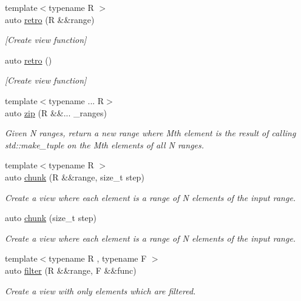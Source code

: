 \begin{DoxyCompactItemize}
{\footnotesize template$<$typename R $>$ }\\auto \mbox{\hyperlink{namespacerah_1_1view_a9f47b2859b0a8a7e136f09d5c33b89e6}{retro}} (R \&\&range)
\begin{DoxyCompactList}\small\item\em \mbox{[}Create view function\mbox{]} \end{DoxyCompactList}\item 
auto \mbox{\hyperlink{namespacerah_1_1view_a8cafe11e62b8f98833a9172cc803f116}{retro}} ()
\begin{DoxyCompactList}\small\item\em \mbox{[}Create view function\mbox{]} \end{DoxyCompactList}\item 
{\footnotesize template$<$typename ... R$>$ }\\auto \mbox{\hyperlink{namespacerah_1_1view_a5b9cacbf101962d95221b591d7f11026}{zip}} (R \&\&... \+\_\+ranges)
\begin{DoxyCompactList}\small\item\em Given N ranges, return a new range where Mth element is the result of calling std\+::make\+\_\+tuple on the Mth elements of all N ranges. \end{DoxyCompactList}\item 
{\footnotesize template$<$typename R $>$ }\\auto \mbox{\hyperlink{namespacerah_1_1view_a2859e5c6e21d7a2bf9e188539602daa7}{chunk}} (R \&\&range, size\+\_\+t step)
\begin{DoxyCompactList}\small\item\em Create a view where each element is a range of N elements of the input range. \end{DoxyCompactList}\item 
auto \mbox{\hyperlink{namespacerah_1_1view_a5b3a70ad1a0373e8fadbfa26a9676077}{chunk}} (size\+\_\+t step)
\begin{DoxyCompactList}\small\item\em Create a view where each element is a range of N elements of the input range. \end{DoxyCompactList}\item 
{\footnotesize template$<$typename R , typename F $>$ }\\auto \mbox{\hyperlink{namespacerah_1_1view_a69010369aadc2a36ee9517195f783e9a}{filter}} (R \&\&range, F \&\&func)
\begin{DoxyCompactList}\small\item\em Create a view with only elements which are filtered. \end{DoxyCompactList}\item 

\end{DoxyCompactItemize}
